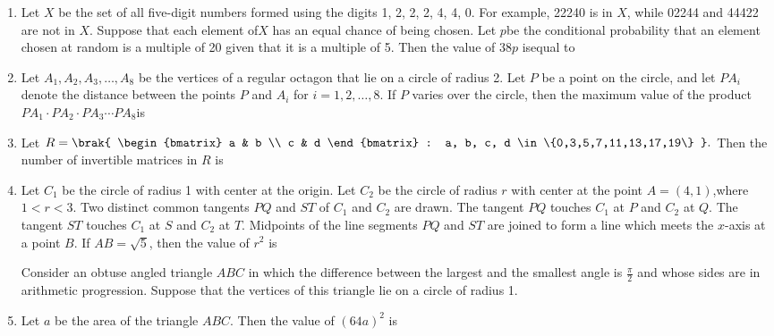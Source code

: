 \documentclass[12pt,a4paper]{article}
\begin{document}
\begin{enumerate}
\vspace{0.5cm}
\item Let $X$ be the set of all five-digit numbers formed using the digits 1, 2, 2, 2, 4, 4, 0. For example, 22240 is in $X$, while 02244 and 44422 are not in $X$. Suppose that each element of$X$ has an equal chance of being chosen. Let $p$be the conditional probability that an element chosen at random is a multiple of 20 given that it is a multiple of 5. Then the value of $38p$ isequal to

\vspace{0.5cm}
\item Let $A_1, A_2, A_3, \dots, A_8$ be the vertices of a regular octagon that lie on a circle of radius 2. Let $P$ be a point on the circle, and let $PA_i$ denote the distance between the points $P$ and $A_i$ for $i = 1,2, \dots, 8$. If $P$ varies over the circle, then the maximum value of the product $PA_1 \cdot PA_2 \cdot PA_3 \cdots PA_8$is


\vspace{0.5cm}
\item Let $R = \brak{ \begin{bmatrix} a & b \\ c & d \end{bmatrix} : a, b, c, d \in \{0,3,5,7,11,13,17,19\} }.$
Then the number of invertible matrices in $R$ is


\vspace{0.5cm}
\item Let $C_1$ be the circle of radius 1 with center at the origin. Let $C_2$ be the circle of radius $r$ with center at the point $A = (4,1)$,where $1 < r < 3$. Two distinct common tangents $PQ$ and $ST$ of $C_1$ and $C_2$ are drawn. The tangent $PQ$ touches $C_1$ at $P$ and $C_2$ at $Q$. The tangent $ST$ touches $C_1$ at $S$ and $C_2$ at $T$. Midpoints of the line segments $PQ$ and $ST$ are joined to form a line which meets the $x$-axis at a point $B$. If $AB = \sqrt{5}$, then the value of $r^2$ is



\vspace{1.5cm}
\noindent Consider an obtuse angled triangle $ABC$ in which the difference between the largest and the smallest angle is $\frac{\pi}{2}$ and whose sides are in arithmetic progression. Suppose that the vertices of this triangle lie on a circle of radius 1.

\item Let $a$ be the area of the triangle $ABC$. Then the value of $(64a)^2$ is


\end{enumerate}
\end{document}
